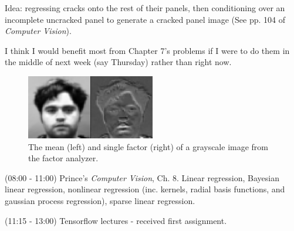 \documentclass[idxtotoc,hyperref,openany]{labbook} %
\begin{document}
 Idea: regressing cracks onto the rest of their panels, then conditioning over an incomplete uncracked panel to generate a cracked panel image (See pp. 104 of \emph{Computer Vision}).
 
 I think I would benefit most from Chapter 7's problems if I were to do them in the middle of next week (say Thursday) rather than right now.
 
 \begin{figure}[h!]
 \centering
 \includegraphics[width=0.5\textwidth]{factor_analyzer_class_mean_and_factor.png}
 \caption{The mean (left) and single factor (right) of a grayscale image from the factor analyzer.}
 \end{figure}
 
 
 
 
 (08:00 - 11:00) Prince's \emph{Computer Vision}, Ch. 8. Linear regression, Bayesian linear regression, nonlinear regression (inc. kernels, radial basis functions, and gaussian process regression), sparse linear regression.
 
 (11:15 - 13:00) Tensorflow lectures - received first assignment.
 
\end{document}

